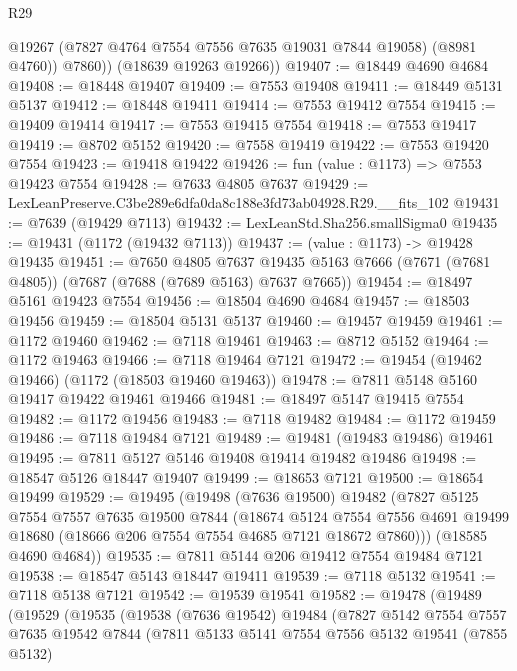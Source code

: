 \begin{lexlean}{R29}
\begin{coremodule}
            @19267
            (@7827 @4764 @7554 @7556 @7635 @19031 @7844 @19058)
            (@8981 @4760))
          @7860))
      (@18639 @19263 @19266))
@19407 := @18449 @4690 @4684
@19408 := @18448 @19407
@19409 := @7553 @19408
@19411 := @18449 @5131 @5137
@19412 := @18448 @19411
@19414 := @7553 @19412 @7554
@19415 := @19409 @19414
@19417 := @7553 @19415 @7554
@19418 := @7553 @19417
@19419 := @8702 @5152
@19420 := @7558 @19419
@19422 := @7553 @19420 @7554
@19423 := @19418 @19422
@19426 := fun (value : @1173) => @7553 @19423 @7554
@19428 := @7633 @4805 @7637
@19429 := LexLeanPreserve.C3be289e6dfa0da8c188e3fd73ab04928.R29.__fits_102
@19431 := @7639 (@19429 @7113)
@19432 := LexLeanStd.Sha256.smallSigma0
@19435 := @19431 (@1172 (@19432 @7113))
@19437 := (value : @1173) -> @19428 @19435
@19451 := @7650
    @4805
    @7637
    @19435
    @5163
    @7666
    (@7671 (@7681 @4805))
    (@7687 (@7688 (@7689 @5163) @7637 @7665))
@19454 := @18497 @5161 @19423 @7554
@19456 := @18504 @4690 @4684
@19457 := @18503 @19456
@19459 := @18504 @5131 @5137
@19460 := @19457 @19459
@19461 := @1172 @19460
@19462 := @7118 @19461
@19463 := @8712 @5152
@19464 := @1172 @19463
@19466 := @7118 @19464 @7121
@19472 := @19454 (@19462 @19466) (@1172 (@18503 @19460 @19463))
@19478 := @7811 @5148 @5160 @19417 @19422 @19461 @19466
@19481 := @18497 @5147 @19415 @7554
@19482 := @1172 @19456
@19483 := @7118 @19482
@19484 := @1172 @19459
@19486 := @7118 @19484 @7121
@19489 := @19481 (@19483 @19486) @19461
@19495 := @7811 @5127 @5146 @19408 @19414 @19482 @19486
@19498 := @18547 @5126 @18447 @19407
@19499 := @18653 @7121
@19500 := @18654 @19499
@19529 := @19495
    (@19498
      (@7636 @19500)
      @19482
      (@7827
        @5125
        @7554
        @7557
        @7635
        @19500
        @7844
        (@18674
          @5124
          @7554
          @7556
          @4691
          @19499
          @18680
          (@18666 @206 @7554 @7554 @4685 @7121 @18672 @7860)))
      (@18585 @4690 @4684))
@19535 := @7811 @5144 @206 @19412 @7554 @19484 @7121
@19538 := @18547 @5143 @18447 @19411
@19539 := @7118 @5132
@19541 := @7118 @5138 @7121
@19542 := @19539 @19541
@19582 := @19478
    (@19489
      (@19529
        (@19535
          (@19538
            (@7636 @19542)
            @19484
            (@7827
              @5142
              @7554
              @7557
              @7635
              @19542
              @7844
              (@7811
                @5133
                @5141
                @7554
                @7556
                @5132
                @19541
                (@7855 @5132)

\end{coremodule}
\end{lexlean}

